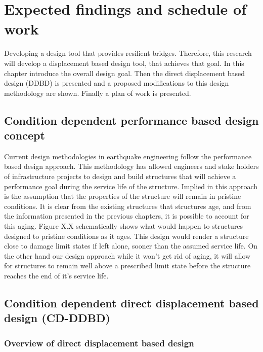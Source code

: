 \chapter{Expected findings and schedule of work}
Developing a design tool that provides resilient bridges. Therefore, this research will develop a displacement based design tool, that achieves that goal. In this chapter introduce the overall design goal. Then the direct displacement based design (DDBD) is presented and a proposed modifications to this design methodology are shown. Finally a plan of work is presented.

\section{Condition dependent performance based design concept}

Current design methodologies in earthquake engineering follow the performance based design approach. This methodology has allowed engineers and stake holders of infrastructure projects to design and build structures that will achieve a performance goal during the service life of the structure. Implied in this approach is the assumption that the properties of the structure will remain in pristine conditions. It is clear from the existing structures that structures age, and from the information presented in the previous chapters, it is possible to account for this aging. Figure X.X schematically shows what would happen to structures designed to pristine conditions as it ages. This design would render a structure close to damage limit states if left alone, sooner than the assumed service life. On the other hand our design approach while it won't get rid of aging, it will allow for structures to remain well above a prescribed limit state before the structure reaches the end of it's service life. 

\section{Condition dependent direct displacement based design (CD-DDBD)}
\subsection{Overview of direct displacement based design}

